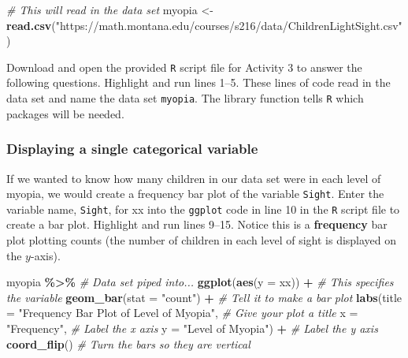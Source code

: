 \documentclass[
]{report}
\newenvironment{Shaded}{\begin{snugshade}}{\end{snugshade}}
\newcommand{\CommentTok}[1]{\textcolor[rgb]{0.56,0.35,0.01}{\textit{#1}}}
\newcommand{\DataTypeTok}[1]{\textcolor[rgb]{0.13,0.29,0.53}{#1}}
\newcommand{\KeywordTok}[1]{\textcolor[rgb]{0.13,0.29,0.53}{\textbf{#1}}}
\newcommand{\NormalTok}[1]{#1}
\newcommand{\OperatorTok}[1]{\textcolor[rgb]{0.81,0.36,0.00}{\textbf{#1}}}
\newcommand{\StringTok}[1]{\textcolor[rgb]{0.31,0.60,0.02}{#1}}
\begin{document}
\begin{Shaded}
\begin{Highlighting}[]
\CommentTok{\# This will read in the data set}
\NormalTok{myopia \textless{}{-}}\StringTok{ }\KeywordTok{read.csv}\NormalTok{(}\StringTok{"https://math.montana.edu/courses/s216/data/ChildrenLightSight.csv"}\NormalTok{) }
\end{Highlighting}
\end{Shaded}

Download and open the provided \texttt{R} script file for Activity 3 to answer the following questions. Highlight and run lines 1--5. These lines of code read in the data set and name the data set \texttt{myopia}. The library function tells \texttt{R} which packages will be needed.

\hypertarget{displaying-a-single-categorical-variable}{%
\subsubsection*{Displaying a single categorical variable}\label{displaying-a-single-categorical-variable}}

If we wanted to know how many children in our data set were in each level of myopia, we would create a frequency bar plot of the variable \texttt{Sight}. Enter the variable name, \texttt{Sight}, for xx into the \texttt{ggplot} code in line 10 in the \texttt{R} script file to create a bar plot. Highlight and run lines 9--15. Notice this is a \textbf{frequency} bar plot plotting counts (the number of children in each level of sight is displayed on the \(y\)-axis).

\begin{Shaded}
\begin{Highlighting}[]
\NormalTok{myopia }\OperatorTok{\%\textgreater{}\%}\StringTok{ }\CommentTok{\# Data set piped into...}
\KeywordTok{ggplot}\NormalTok{(}\KeywordTok{aes}\NormalTok{(}\DataTypeTok{y =}\NormalTok{ xx)) }\OperatorTok{+}\StringTok{   }\CommentTok{\# This specifies the variable}
\StringTok{  }\KeywordTok{geom\_bar}\NormalTok{(}\DataTypeTok{stat =} \StringTok{"count"}\NormalTok{) }\OperatorTok{+}\StringTok{  }\CommentTok{\# Tell it to make a bar plot}
\StringTok{  }\KeywordTok{labs}\NormalTok{(}\DataTypeTok{title =} \StringTok{"Frequency Bar Plot of Level of Myopia"}\NormalTok{,  }\CommentTok{\# Give your plot a title}
       \DataTypeTok{x =} \StringTok{"Frequency"}\NormalTok{,   }\CommentTok{\# Label the x axis}
       \DataTypeTok{y =} \StringTok{"Level of Myopia"}\NormalTok{)  }\OperatorTok{+}\StringTok{ }\CommentTok{\# Label the y axis}
\StringTok{  }\KeywordTok{coord\_flip}\NormalTok{()  }\CommentTok{\# Turn the bars so they are vertical}
\end{Highlighting}
\end{Shaded}
\end{document}
